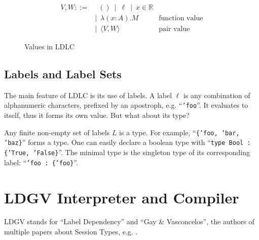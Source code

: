 \begin{figure}
\begin{align*}
    V, W ::=
    & \enspace () \enspace|\enspace
      \ell \enspace|\enspace
      x \in \mathbb{R} \\
    & |\enspace \lambda (x:A).M & \text{function value} \\
    & |\enspace \langle V, W \rangle & \text{pair value}
\end{align*}
\caption{Values in LDLC}
\label{fig:ldlc-values}
\end{figure}

\subsection{Labels and Label Sets}

The main feature of LDLC is its use of labels. A label $\ell$ is any combination of alphanumeric characters, prefixed by an apostroph, e.g. ``\texttt{'foo}''. It evaluates to itself, thus it forms its own value. But what about its type?

Any finite non-empty set of labels $L$ is a type. For example, ``\texttt{\{'foo, 'bar, 'baz\}}'' forms a type. One can easily declare a boolean type with ``\texttt{type Bool : \{'True, 'False\}}''. The minimal type is the singleton type of its corresponding label: ``\texttt{'foo : \{'foo\}}''.



\section{LDGV Interpreter and Compiler}

LDGV stands for ``Label Dependency'' and ``Gay \& Vasconcelos'', the authors of multiple papers about Session Types, e.g. \cite{gayvasconcelos2010}.
